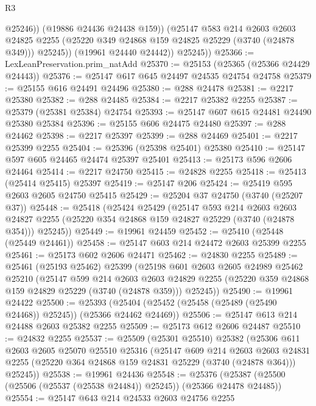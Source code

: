\begin{lexlean}{R3}
\begin{coremodule}
                  @25246))
              (@19886 @24436 @24438 @159))
            (@25147
              @583
              @214
              @2603
              @2603
              @24825
              @2255
              (@25220 @349 @24868 @159 @24825 @25229 (@3740 (@24878 @349)))
              @25245))
          (@19961 @24440 @24442))
        @25245))
@25366 := LexLeanPreservation.prim_natAdd
@25370 := @25153 (@25365 (@25366 @24429 @24443))
@25376 := @25147 @617 @645 @24497 @24535 @24754 @24758
@25379 := @25155 @616 @24491 @24496
@25380 := @288 @24478
@25381 := @2217 @25380
@25382 := @288 @24485
@25384 := @2217 @25382 @2255
@25387 := @25379 (@25381 @25384) @24754
@25393 := @25147 @607 @615 @24481 @24490 @25380 @25384
@25396 := @25155 @606 @24475 @24480
@25397 := @288 @24462
@25398 := @2217 @25397
@25399 := @288 @24469
@25401 := @2217 @25399 @2255
@25404 := @25396 (@25398 @25401) @25380
@25410 := @25147 @597 @605 @24465 @24474 @25397 @25401
@25413 := @25173 @596 @2606 @24464
@25414 := @2217 @24750
@25415 := @24828 @2255
@25418 := @25413 (@25414 @25415) @25397
@25419 := @25147 @206
@25424 := @25419 @595 @2603 @2605 @24750 @25415
@25429 := @25204 @37 @24750 (@3740 (@25207 @37))
@25448 := @25418
    (@25424
      @25429
      (@25147
        @593
        @214
        @2603
        @2603
        @24827
        @2255
        (@25220 @354 @24868 @159 @24827 @25229 (@3740 (@24878 @354)))
        @25245))
@25449 := @19961 @24459
@25452 := @25410 (@25448 (@25449 @24461))
@25458 := @25147 @603 @214 @24472 @2603 @25399 @2255
@25461 := @25173 @602 @2606 @24471
@25462 := @24830 @2255
@25489 := @25461
    (@25193 @25462)
    @25399
    (@25198
      @601
      @2603
      @2605
      @24989
      @25462
      @25210
      (@25147
        @599
        @214
        @2603
        @2603
        @24829
        @2255
        (@25220 @359 @24868 @159 @24829 @25229 (@3740 (@24878 @359)))
        @25245))
@25490 := @19961 @24422
@25500 := @25393 (@25404 (@25452 (@25458 (@25489 (@25490 @24468)) @25245)) (@25366 @24462 @24469))
@25506 := @25147 @613 @214 @24488 @2603 @25382 @2255
@25509 := @25173 @612 @2606 @24487
@25510 := @24832 @2255
@25537 := @25509
    (@25301 @25510)
    @25382
    (@25306
      @611
      @2603
      @2605
      @25070
      @25510
      @25316
      (@25147
        @609
        @214
        @2603
        @2603
        @24831
        @2255
        (@25220 @364 @24868 @159 @24831 @25229 (@3740 (@24878 @364)))
        @25245))
@25538 := @19961 @24436
@25548 := @25376 (@25387 (@25500 (@25506 (@25537 (@25538 @24484)) @25245)) (@25366 @24478 @24485))
@25554 := @25147 @643 @214 @24533 @2603 @24756 @2255

\end{coremodule}
\end{lexlean}

